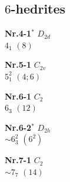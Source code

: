 \documentclass[12pt]{article}
\begin{document}
\subsection{$6$-hedrites}\label{subsection-6-hedrites}
{\small
\setlength{\unitlength}{1cm}
\begin{minipage}[t]{3.5cm}
\centering
\epsfxsize=2.5cm
\par
{{\bf Nr.4-1${}^*$} \quad $D_{2d}$\\ $4_{1}$ \quad $(8)$\\\vspace{3mm} }
\end{minipage}
\setlength{\unitlength}{1cm}
\begin{minipage}[t]{3.5cm}
\centering
\epsfxsize=2.5cm
\par
{{\bf Nr.5-1} \quad $C_{2v}$\\ $5^2_{1}$ \quad $(4;6)$\\\vspace{3mm} }
\end{minipage}
\setlength{\unitlength}{1cm}
\begin{minipage}[t]{3.5cm}
\centering
\epsfxsize=2.5cm
\par
{{\bf Nr.6-1} \quad $C_{2}$\\ $6_{3}$ \quad $(12)$\\\vspace{3mm} }
\end{minipage}
\setlength{\unitlength}{1cm}
\begin{minipage}[t]{3.5cm}
\centering
\epsfxsize=2.5cm
\par
{{\bf Nr.6-2${}^*$} \quad $D_{2h}$\\ $\sim 6^2_{3}$ \quad $(6^2)$\\\vspace{3mm} }
\end{minipage}
\setlength{\unitlength}{1cm}
\begin{minipage}[t]{3.5cm}
\centering
\epsfxsize=2.5cm
\par
{{\bf Nr.7-1} \quad $C_{2}$\\ $\sim 7_{7}$ \quad $(14)$\\\vspace{3mm} }
\end{minipage}
\setlength{\unitlength}{1cm}
\begin{minipage}[t]{3.5cm}
\centering
\epsfxsize=2.5cm
\par

\end{minipage}}
\end{document}
